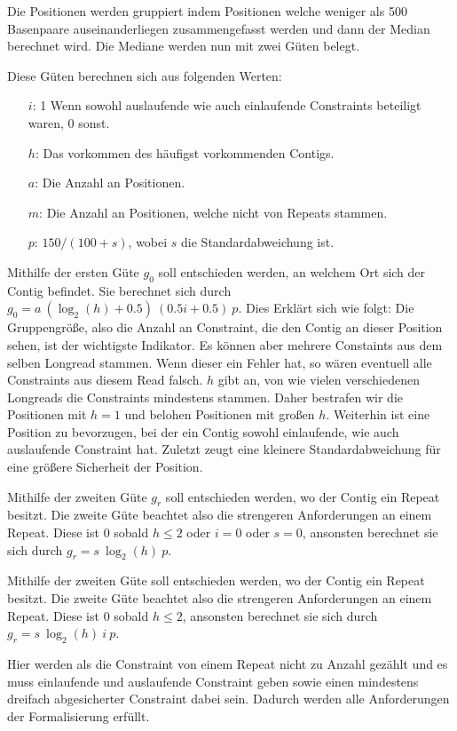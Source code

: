 Die Positionen werden gruppiert indem Positionen welche weniger als 500 Basenpaare auseinanderliegen zusammengefasst werden und dann der Median berechnet wird. Die Mediane werden nun mit zwei Güten belegt. 

Diese Güten berechnen sich aus folgenden Werten:
\begin{itemize}
\item[$i$:] 1 Wenn sowohl auslaufende wie auch einlaufende Constraints beteiligt waren, 0 sonst.
\item[$h$:] Das vorkommen des häufigst vorkommenden Contigs. 
\item[$a$:] Die Anzahl an Positionen.
\item[$m$:] Die Anzahl an Positionen, welche nicht von Repeats stammen.
\item[$p$:] $150 / (100+s)$, wobei $s$ die Standardabweichung ist.
\end{itemize}

Mithilfe der ersten Güte $g_0$ soll entschieden werden, an welchem Ort sich der Contig befindet. Sie berechnet sich durch 
$g_0 = a\ (\log_2(h) + 0.5) \ (0.5i + 0.5)\  p$. Dies Erklärt sich wie folgt: Die Gruppengröße, also die Anzahl an Constraint, die den Contig an dieser Position sehen, ist der wichtigste Indikator. 
 Es können aber mehrere Constaints aus dem selben Longread stammen. Wenn dieser ein Fehler hat, so wären eventuell alle Constraints aus diesem Read falsch. $h$ gibt an, von wie vielen verschiedenen Longreads die Constraints mindestens stammen. Daher bestrafen wir die Positionen mit $h=1$ und belohen Positionen mit großen $h$. 
Weiterhin ist eine Position zu bevorzugen, bei der ein Contig sowohl einlaufende, wie auch auslaufende Constraint hat. Zuletzt zeugt eine kleinere Standardabweichung für eine größere Sicherheit der Position. 

Mithilfe der zweiten Güte $g_r$ soll entschieden werden, wo der Contig ein Repeat besitzt. Die zweite Güte beachtet also die strengeren Anforderungen an einem Repeat. Diese ist 0 sobald $h \leq 2$ oder $i = 0$ oder $s = 0$, ansonsten berechnet sie sich durch $g_r = s\ \log_2(h) \  p$.


Mithilfe der zweiten Güte soll entschieden werden, wo der Contig ein Repeat besitzt. Die zweite Güte beachtet also die strengeren Anforderungen an einem Repeat. Diese ist 0 sobald $h \leq 2$, ansonsten berechnet sie sich durch $g_r = s\ \log_2(h) \ i \  p$.

Hier werden als die Constraint von einem Repeat nicht zu Anzahl gezählt
und es muss einlaufende und auslaufende Constraint geben sowie einen mindestens dreifach abgesicherter Constraint dabei sein. Dadurch werden alle Anforderungen der Formalisierung erfüllt.

